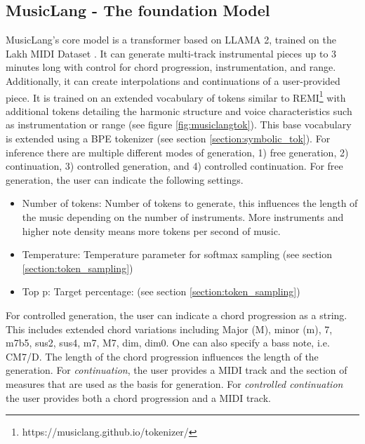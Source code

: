 \subsection{MusicLang - The foundation Model}
MusicLang's core model is a transformer based on LLAMA 2, trained on the Lakh MIDI Dataset \cite{Raffel_2016}. It can generate multi-track instrumental pieces up to 3 minutes long with control for chord progression, instrumentation, and range. Additionally, it can create interpolations and continuations of a user-provided piece. It is trained on an extended vocabulary of tokens similar to REMI\footnote{https://musiclang.github.io/tokenizer/} with additional tokens detailing the harmonic structure and voice characteristics such as instrumentation or range (see figure \ref{fig:musiclangtok}). This base vocabulary is extended using a BPE tokenizer (see section \ref{section:symbolic_tok}). 
For inference there are multiple different modes of generation, 1) free generation, 2) continuation, 3) controlled generation, and 4) controlled continuation. For free generation, the user can indicate the following settings.
\begin{itemize}
\item Number of tokens: Number of tokens to generate, this influences the length of the music depending on the number of instruments. More instruments and higher note density means more tokens per second of music.
\item Temperature: Temperature parameter for softmax sampling (see section \ref{section:token_sampling})
\item Top p: Target percentage: (see section \ref{section:token_sampling}) 
\end{itemize}
For controlled generation, the user can indicate a chord progression as a string. This includes extended chord variations including Major (M), minor (m), 7, m7b5, sus2, sus4, m7, M7, dim, dim0. One can also specify a bass note, i.e. CM7/D. The length of the chord progression influences the length of the generation.
For \textit{continuation}, the user provides a MIDI track and the section of measures that are used as the basis for generation.
For \textit{controlled continuation} the user provides both a chord progression and a MIDI track. 

